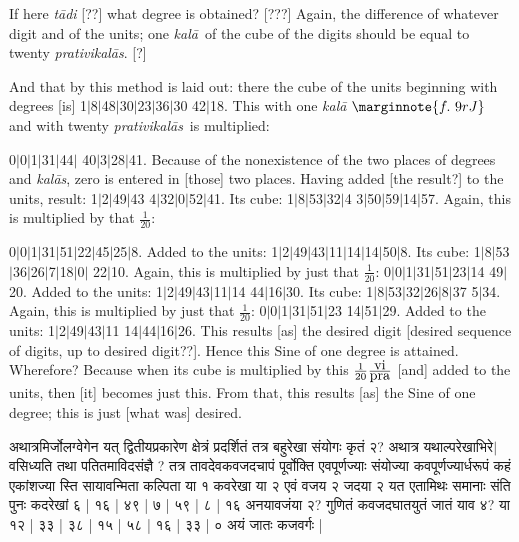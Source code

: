 \documentclass[12pt]{book}
\def\kala{\textit{ka\-l\=a}}
\def\kalas{\textit{ka\-l\=as}}
\def\prativikalas{\textit{prati\-vi\-ka\-l\=as}}
\def\danda{$|$}
\begin{document}
If here \textit{t\=adi} [??] what degree is obtained?  [???] 
Again, the difference of whatever digit and of the units; one \kala\ of the cube of the digits
should be equal to twenty \prativikalas. [?]

And that by this method is laid out: there the cube of the units beginning with degrees [is]
1\danda 8\danda 48\danda 30\danda 23\danda 36\danda 30 42\danda 18.
This with one \kala
$\marginnote{f.~9r J}$
and with twenty \prativikalas\ is multiplied: 

0\danda 0\danda 1\danda 31\danda 44\danda
40\danda 3\danda 28\danda 41.
Because of the nonexistence of the two places of degrees and \kalas, zero is entered in 
[those] two places. Having added [the result?] to the units, result:
1\danda 2\danda 49\danda 43 4\danda 32\danda 0\danda 52\danda 41. Its cube:
1\danda 8\danda 53\danda 32\danda 4 3\danda 50\danda 59\danda 14\danda 57.
Again, this  is multiplied by that $\frac{1}{20}$: 


0\danda 0\danda 1\danda 31\danda 51\danda 22\danda 45\danda 25\danda 8.
Added to the units:
1\danda 2\danda 49\danda 43\danda 11\danda 14\danda 14\danda 50\danda 8.
Its cube: 1\danda 8\danda 53\danda 36\danda 26\danda 7\danda 18\danda 0\danda
22\danda 10.
Again, this is multiplied by just that $\frac{1}{20}$: 
0\danda 0\danda 1\danda 31\danda 51\danda 23\danda 14 49\danda 20.
Added to the units: 1\danda 2\danda 49\danda 43\danda 11\danda 14 44\danda 16\danda 30.
Its cube: 1\danda 8\danda 53\danda 32\danda 26\danda 8\danda 37 5\danda 34.
Again, this is multiplied by just that $\frac{1}{20}$: 
0\danda 0\danda 1\danda 31\danda 51\danda 23 14\danda 51\danda 29. 
Added to the units: 1\danda 2\danda 49\danda 43\danda 11 14\danda 44\danda 16\danda 26.
This results [as] the desired digit [desired sequence of digits, up to desired digit??]. 
Hence this Sine of one degree is attained.  Wherefore?  Because when its cube 
is multiplied by this $\frac{1}{20} \frac{\hbox{vi}}{\hbox{pra}}$ [and] added to the units,
then [it] becomes just this. From that, this results [as] the Sine of one degree; this is just
[what was] desired. 

\newpage

{\s अथात्रमिर्जोलग्वेगेन
यत् द्वितीयप्रकारेण क्षेत्रं प्रदर्शितं तत्र बहुरेखा संयोगः कृतं २? अथात्र यथाल्परेखाभिरे$|$
वसिध्यति तथा पतितमाविदसंज्ञै ?
तत्र तावदेवकवजदचापं पूर्वोक्ति एवपूर्णज्याः
संयोज्या कवपूर्णज्यार्धरूपं कहं एकांशज्या स्ति
सायावन्मिता कल्पिता या १ कवरेखा या २ एवं वजय २ जदया २ यत एतामिथः
समानाः संति पुनः कदरेखां ६ | १६ | ४९ | ७ | ५९ | ८ | १६ अनयावजंया २?
गुणितं कवजदघातयुतं जातं याव ४? या १२ | ३३ | ३८ | १५ | ५८ | १६ | ३३ | ० अयं
जातः कजवर्गः |} \\ 
\end{document}

